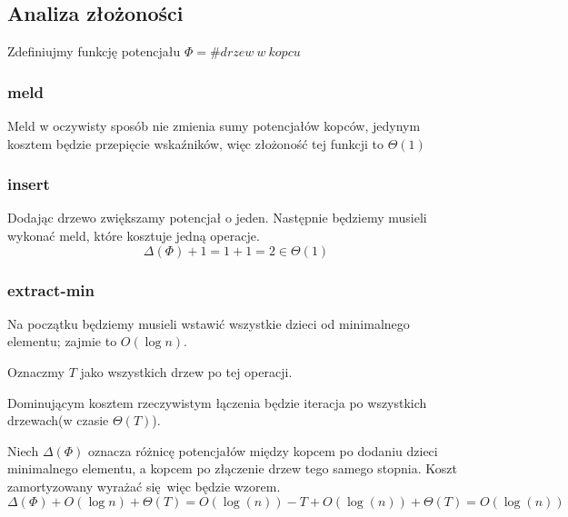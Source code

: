 \subsection{Analiza złożoności}
Zdefiniujmy funkcję potencjału $\Phi = \#drzew~w~kopcu$
\subsubsection{meld}
Meld w oczywisty sposób nie zmienia sumy potencjałów kopców, jedynym kosztem będzie przepięcie wskaźników, więc złożoność tej funkcji to $\Theta(1)$
\subsubsection{insert}
Dodając drzewo zwiększamy potencjał o jeden.
Następnie będziemy musieli wykonać meld, które kosztuje jedną operacje.
\[
  \Delta(\Phi) + 1 = 1 + 1 = 2 \in \Theta(1)
\]
\subsubsection{extract-min}
Na początku będziemy musieli wstawić wszystkie dzieci od minimalnego elementu; zajmie to $O(\log n)$.

Oznaczmy $T$ jako wszystkich drzew po tej operacji.

Dominującym kosztem rzeczywistym łączenia będzie iteracja po wszystkich drzewach(w czasie $\Theta(T)$).

Niech $\Delta(\Phi)$ oznacza różnicę potencjałów między kopcem po dodaniu dzieci minimalnego elementu, a kopcem po złączenie drzew tego samego stopnia.
Koszt zamortyzowany wyrażać się więc będzie wzorem.
\[
  \Delta(\Phi) + O(\log n) + \Theta(T) = O(\log(n)) - T + O(\log(n)) + \Theta(T) = O(\log(n))
\]

